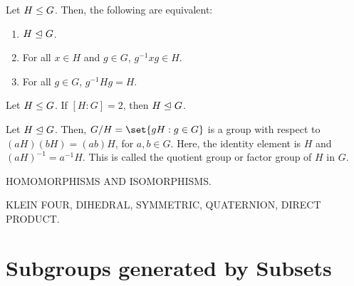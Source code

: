 \documentclass[11pt]{penrose}
\begin{document}
\begin{nthm}
    Let $H \mathrel{\leq} G$. Then, the following are equivalent:
    \begin{enumerate}
        \item $H \mathrel{\trianglelefteq} G$.
        \item For all $x \in H$ and $g \in G$, $g^{-1} x g \in H$.
        \item For all $g \in G$, $g^{-1} H g = H$.
    \end{enumerate}
\end{nthm}

\begin{nthm}
    Let $H \mathrel{\leq} G$. If $[H:G] = 2$, then $H \mathrel{\trianglelefteq} G$.
\end{nthm}

\begin{nthm}
    Let $H \mathrel{\trianglelefteq} G$. Then, $G/H = \set{gH : g \in G}$ is a group with respect to $(aH)(bH) = (ab)H$, for $a, b \in G$. Here, the identity element is $H$ and $(aH)^{-1} = a^{-1} H$. This is called the quotient group or factor group of $H$ in $G$.
\end{nthm}


HOMOMORPHISMS AND ISOMORPHISMS.



KLEIN FOUR, DIHEDRAL, SYMMETRIC, QUATERNION, DIRECT PRODUCT.



\section{Subgroups generated by Subsets}
\end{document}
